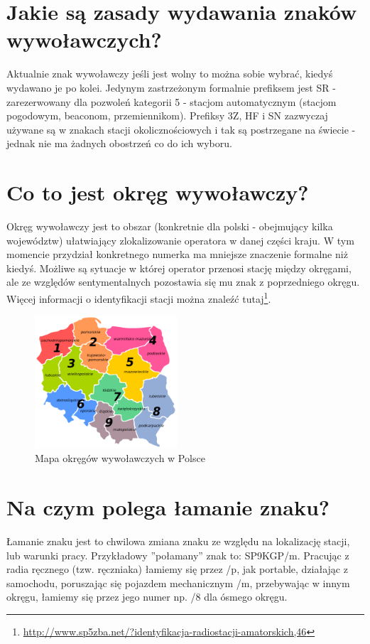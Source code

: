 \documentclass[a4paper,12pt]{article}
\begin{document}
\section{Jakie są zasady wydawania znaków wywoławczych?}
Aktualnie znak wywoławczy jeśli jest wolny to można sobie wybrać, kiedyś wydawano je po kolei. Jedynym zastrzeżonym formalnie prefiksem jest SR - zarezerwowany dla pozwoleń kategorii 5 - stacjom automatycznym (stacjom pogodowym, beaconom, przemiennikom). Prefiksy 3Z, HF i SN zazwyczaj używane są w znakach stacji okolicznościowych i tak są postrzegane na świecie - jednak nie ma żadnych obostrzeń co do ich wyboru.

\section{Co to jest okręg wywoławczy?}
Okręg wywoławczy jest to obszar (konkretnie dla polski - obejmujący kilka województw) ułatwiający zlokalizowanie operatora w danej części kraju. W tym momencie przydział konkretnego numerka ma mniejsze znaczenie formalne niż kiedyś. Możliwe są sytuacje w której operator przenosi stację między okręgami, ale ze względów sentymentalnych pozostawia się mu znak z poprzedniego okręgu. Więcej informacji o identyfikacji stacji można znaleźć tutaj\footnote{\url{http://www.sp5zba.net/?identyfikacja-radiostacji-amatorskich,46}}. 
\begin{figure}[h]
 \centering
 \includegraphics[width=150pt]{./Polish_HAM_Radio_Regions.png}
 \caption{Mapa okręgów wywoławczych w Polsce}
\end{figure}

\section{Na czym polega łamanie znaku?}
Łamanie znaku jest to chwilowa zmiana znaku ze względu na lokalizację stacji, lub warunki pracy. Przykładowy ”połamany” znak to: SP9KGP/m. Pracując z radia ręcznego (tzw. ręczniaka) łamiemy się przez /p, jak portable, działając z samochodu, poruszając się pojazdem mechanicznym /m, przebywając w innym okręgu, łamiemy się przez jego numer np. /8 dla ósmego okręgu. 
\end{document}
